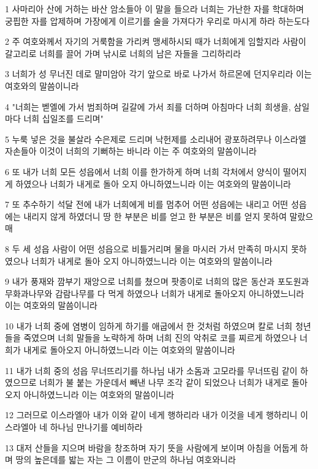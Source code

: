 \par 1 사마리아 산에 거하는 바산 암소들아 이 말을 들으라 너희는 가난한 자를 학대하며 궁핍한 자를 압제하며 가장에게 이르기를 술을 가져다가 우리로 마시게 하라 하는도다
\par 2 주 여호와께서 자기의 거룩함을 가리켜 맹세하시되 때가 너희에게 임할지라 사람이 갈고리로 너희를 끌어 가며 낚시로 너희의 남은 자들을 그리하리라
\par 3 너희가 성 무너진 데로 말미암아 각기 앞으로 바로 나가서 하르몬에 던지우리라 이는 여호와의 말씀이니라
\par 4 "너희는 벧엘에 가서 범죄하며 길갈에 가서 죄를 더하며 아침마다 너희 희생을, 삼일 마다 너희 십일조를 드리며"
\par 5 누룩 넣은 것을 불살라 수은제로 드리며 낙헌제를 소리내어 광포하려무나 이스라엘 자손들아 이것이 너희의 기뻐하는 바니라 이는 주 여호와의 말씀이니라
\par 6 또 내가 너희 모든 성읍에서 너희 이를 한가하게 하며 너희 각처에서 양식이 떨어지게 하였으나 너희가 내게로 돌아 오지 아니하였느니라 이는 여호와의 말씀이니라
\par 7 또 추수하기 석달 전에 내가 너희에게 비를 멈추어 어떤 성읍에는 내리고 어떤 성읍에는 내리지 않게 하였더니 땅 한 부분은 비를 얻고 한 부분은 비를 얻지 못하여 말랐으매
\par 8 두 세 성읍 사람이 어떤 성읍으로 비틀거리며 물을 마시러 가서 만족히 마시지 못하였으나 너희가 내게로 돌아 오지 아니하였느니라 이는 여호와의 말씀이니라
\par 9 내가 풍재와 깜부기 재앙으로 너희를 쳤으며 팟종이로 너희의 많은 동산과 포도원과 무화과나무와 감람나무를 다 먹게 하였으나 너희가 내게로 돌아오지 아니하였느니라 이는 여호와의 말씀이니라
\par 10 내가 너희 중에 염병이 임하게 하기를 애굽에서 한 것처럼 하였으며 칼로 너희 청년들을 죽였으며 너희 말들을 노략하게 하며 너희 진의 악취로 코를 찌르게 하였으나 너희가 내게로 돌아오지 아니하였느니라 이는 여호와의 말씀이니라
\par 11 내가 너희 중의 성읍 무너뜨리기를 하나님 내가 소돔과 고모라를 무너뜨림 같이 하였으므로 너희가 불 붙는 가운데서 빼낸 나무 조각 같이 되었으나 너희가 내게로 돌아오지 아니하였느니라 이는 여호와의 말씀이니라
\par 12 그러므로 이스라엘아 내가 이와 같이 네게 행하리라 내가 이것을 네게 행하리니 이스라엘아 네 하나님 만나기를 예비하라
\par 13 대저 산들을 지으며 바람을 창조하며 자기 뜻을 사람에게 보이며 아침을 어둡게 하며 땅의 높은데를 밟는 자는 그 이름이 만군의 하나님 여호와니라

